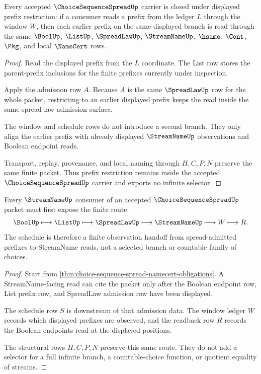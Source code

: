 \begin{theorem}
\label{thm:choice-sequence-spread-prefix-closure}
Every accepted $\ChoiceSequenceSpreadUp$ carrier is closed under displayed
prefix restriction: if a consumer reads a prefix from the ledger $L$ through the
window $W$, then each earlier prefix on the same displayed branch is read
through the same $\BoolUp$, $\ListUp$, $\SpreadLawUp$, $\StreamNameUp$,
$\hsame$, $\Cont$, $\Pkg$, and local $\NameCert$ rows.
\end{theorem}
\begin{proof}
Read the displayed prefix from the $L$ coordinate. The List row stores the
parent-prefix inclusions for the finite prefixes currently under inspection.

Apply the admission row $A$. Because $A$ is the same $\SpreadLawUp$ row for the
whole packet, restricting to an earlier displayed prefix keeps the read inside
the same spread-law admission surface.

The window and schedule rows do not introduce a second branch. They only align
the earlier prefix with already displayed $\StreamNameUp$ observations and
Boolean endpoint reads.

Transport, replay, provenance, and local naming through $H,C,P,N$ preserve the
same finite packet. Thus prefix restriction remains inside the accepted
$\ChoiceSequenceSpreadUp$ carrier and exports no infinite selector.
\end{proof}

\begin{theorem}
\label{thm:choice-sequence-spread-streamname-handoff}
Every $\StreamNameUp$ consumer of an accepted $\ChoiceSequenceSpreadUp$ packet
must first expose the finite route
$$
\BoolUp \longmapsto \ListUp \longmapsto \SpreadLawUp \longmapsto
\StreamNameUp \longmapsto W \longmapsto R .
$$
The schedule is therefore a finite observation handoff from spread-admitted
prefixes to StreamName reads, not a selected branch or countable family of
choices.
\end{theorem}
\begin{proof}
Start from \autoref{thm:choice-sequence-spread-namecert-obligations}. A
StreamName-facing read can cite the packet only after the Boolean endpoint row,
List prefix row, and SpreadLaw admission row have been displayed.

The schedule row $S$ is downstream of that admission data. The window ledger
$W$ records which displayed prefixes are observed, and the readback row $R$
records the Boolean endpoints read at the displayed positions.

The structural rows $H,C,P,N$ preserve this same route. They do not add a
selector for a full infinite branch, a countable-choice function, or quotient
equality of streams.
\end{proof}

